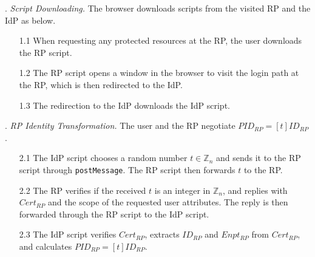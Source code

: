 \vspace{0.85mm}
. {\em Script Downloading.}
The browser downloads scripts from the visited RP and the IdP as below.
\vspace{-\topsep}
\begin{itemize}
\setlength{\topsep}{0pt}
\setlength{\partopsep}{0pt}
\setlength{\itemsep}{0pt}
\setlength{\parsep}{0pt}
\setlength{\parskip}{0pt}
\item[1.1]
When requesting any protected resources at the RP, the user downloads the RP script.
\item[1.2]
The RP script opens a window in the browser to visit the login path at the RP, which is then redirected to the IdP.
\item[1.3]
The redirection to the IdP downloads the IdP script.
\end{itemize}



. {\em RP Identity Transformation.}
The user and the RP negotiate $PID_{RP} = [t]{ID_{RP}}$.
\vspace{-\topsep}
\begin{itemize}
\setlength{\topsep}{0pt}
\setlength{\partopsep}{0pt}
\setlength{\itemsep}{0pt}
\setlength{\parsep}{0pt}
\setlength{\parskip}{0pt}
\item[2.1] The IdP script chooses a random number $t \in \mathbb{Z}_n$ and sends it to the RP script through \verb+postMessage+. The RP script then forwards $t$ to the RP.
\item[2.2] The RP verifies if the received $t$ is an integer in $\mathbb{Z}_n$, and
replies with $Cert_{RP}$ and the scope of the requested user attributes. The reply is then forwarded through the RP script to the IdP script.  %
\item[2.3] The IdP script verifies $Cert_{RP}$, extracts $ID_{RP}$ and $Enpt_{RP}$ from $Cert_{RP}$, and calculates $PID_{RP}=[t]{ID_{RP}}$.

\end{itemize}


